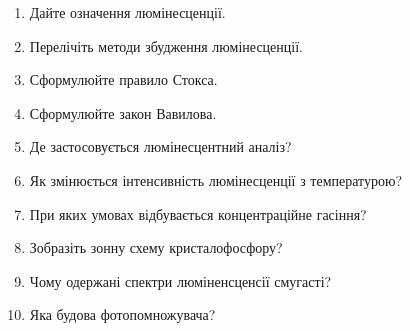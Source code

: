 \documentclass[twocolumn]{el-author}
\begin{document}
\begin{enumerate}
	\item Дайте означення люмінесценції.
	\item Перелічіть методи збудження люмінесценції.
	\item Сформулюйте правило Стокса.
	\item Сформулюйте закон Вавилова.
	\item Де застосовується люмінесцентний аналіз?
	\item Як змінюється інтенсивність люмінесценції з температурою?
	\item При яких умовах відбувається концентраційне гасіння?
	\item Зобразіть зонну схему кристалофосфору?
	\item Чому одержані спектри люміненсценсії смугасті?
	\item Яка будова фотопомножувача?
\end{enumerate}

\clearpage
\begin{figure}[h]
\caption{\source{}}
\label{img:1}
\end{figure}

\begin{figure}[h]
\caption{\source{}}
\label{img:2}
\end{figure}
\end{document}
